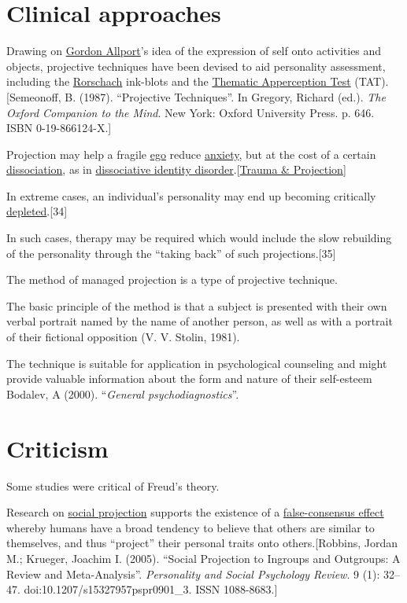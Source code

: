 \documentclass{book}
\numberwithin{equation}{section}
\begin{document}
\section{Clinical approaches}
Drawing on \href{https://en.wikipedia.org/wiki/Gordon_Allport}{Gordon Allport}'s idea of the expression of self onto activities and objects, projective techniques have been devised to aid personality assessment, including the \href{https://en.wikipedia.org/wiki/Rorschach_test}{Rorschach} ink-blots and the \href{https://en.wikipedia.org/wiki/Thematic_Apperception_Test}{Thematic Apperception Test} (TAT).[Semeonoff, B. (1987). ``Projective Techniques''. In Gregory, Richard (ed.). \textit{The Oxford Companion to the Mind}. New York: Oxford University Press. p. 646. ISBN 0-19-866124-X.]

%
Projection may help a fragile \href{https://en.wikipedia.org/wiki/Id,_ego,_and_super-ego}{ego} reduce \href{https://en.wikipedia.org/wiki/Anxiety}{anxiety}, but at the cost of a certain \href{https://en.wikipedia.org/wiki/Dissociation_(psychology)}{dissociation}, as in \href{https://en.wikipedia.org/wiki/Dissociative_identity_disorder}{dissociative identity disorder}.[\href{http://www.medscape.com/viewarticle/408692}{Trauma \& Projection}]

In extreme cases, an individual's personality may end up becoming critically \href{https://en.wikipedia.org/wiki/Ego\_depletion}{depleted}.[34]
    
In such cases, therapy may be required which would include the slow rebuilding of the personality through the ``taking back'' of such projections.[35]

%
The method of managed projection is a type of projective technique.

The basic principle of the method is that a subject is presented with their own verbal portrait named by the name of another person, as well as with a portrait of their fictional opposition (V. V. Stolin, 1981).

%
The technique is suitable for application in psychological counseling and might provide valuable information about the form and nature of their self-esteem Bodalev, A (2000). ``\textit{General psychodiagnostics}''.

\section{Criticism}
Some studies were critical of Freud's theory.

Research on \href{https://en.wikipedia.org/wiki/Social_projection}{social projection} supports the existence of a \href{https://en.wikipedia.org/wiki/False-consensus_effect}{false-consensus effect} whereby humans have a broad tendency to believe that others are similar to themselves, and thus ``project'' their personal traits onto others.[Robbins, Jordan M.; Krueger, Joachim I. (2005). ``Social Projection to Ingroups and Outgroups: A Review and Meta-Analysis''. \textit{Personality and Social Psychology Review}. 9 (1): 32--47. doi:10.1207/s15327957pspr0901\_3. ISSN 1088-8683.]
\end{document}
